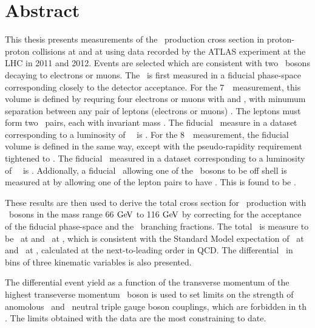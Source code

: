\chapter*{Abstract}
This thesis presents measurements of the \ZZ\ production cross section in
proton-proton collisions at  and at  using data recorded
by the ATLAS experiment at the LHC in 2011 and 2012.  Events are selected which
are consistent with two \Z\ bosons decaying to electrons or muons. The \cx\ is
first measured in a fiducial phase-space corresponding closely to the detector
acceptance. For the 7~\tev\ measurement, this volume is defined by requring four
electrons or muons with  and , with minumum separation
between any pair of leptons (electrons or muons) . The leptons
must form two \ossf\ pairs, each with invariant mass \sstooos. The fiducial \cx\
measure in a dataset corresponding to a luminosity of
\LumiPassGRLTwentyEleven~\ifb\ is \ZZSevenTeVFiducialCrossSectionZZLLLL. For the
8~\tev\ measurement, the fiducial volume is defined in the same way, except with
the pseudo-rapidity requirement tightened to \modetalt{2.7}. The fiducial \cx\
measured in a dataset corresponding to a luminosity of
\LumiPassGRLTwentyTwelve~\ifb\ is \ZZEightTeVFiducialCrossSectionZZLLLL.
Addionally, a fiducial \cx\ allowing one of the \Z\ bosons to be off shell is
measured at \sqrtseq{7} by allowing one of the lepton pairs to have \mllgtt.
This is found to be \ZZSevenTeVFiducialCrossSectionZZsLLLL.

These results are then used to derive the total cross section for \ZZ\
production with \Z\ bosons in the mass range 66$\GeV$ to 116$\GeV$ by
correcting for the acceptance of the fiducial phase-space and the \Zll\
branching fractions. The total \cx\ is measure to be
\ZZSevenTeVTotalCrossSection\ at \sqrtseq{7} and \ZZEightTeVTotalCrossSection\ at
\sqrtseq{8}, which is consistent with the Standard Model
expectation of \ZZSevenTeVTheoryTotalCrossSection\ at \sqrtseq{7} and \ZZEightTeVTheoryTotalCrossSection\ at
\sqrtseq{8}, calculated at the next-to-leading order in QCD.
The differential \cx\ in bins of three kinematic variables is also
presented.

The differential event yield as a function of the transverse momentum of the
highest transeverse momentum \Z\ boson is used to set limits on the strength of
anomolous \ZZZ\ and \ZZg\ neutral triple gauge boson couplings, which are
forbidden in th \sm. 
The limits obtained with the \sqrtseq{8} data are the most
constraining to date.
